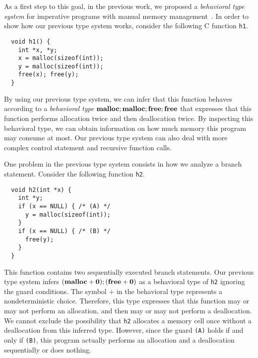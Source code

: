 
As a first step to this goal, in the previous work, we proposed a
\emph{behavioral type system} for imperative programs with manual memory
management~\cite{tanPPL2015}.  In order to show how our previous type
system works, consider the following C function \verb|h1|.
\begin{verbatim}
  void h1() {
    int *x, *y;
    x = malloc(sizeof(int));
    y = malloc(sizeof(int));
    free(x); free(y);
  }
\end{verbatim}
By using our previous type system, we can infer that this function
behaves according to a \emph{behavioral type}
$\mathbf{malloc};\mathbf{malloc};\mathbf{free};\mathbf{free}$ that expresses that this function performs
allocation twice and then deallocation twice.  By inspecting this behavioral
type, we can obtain information on how much memory this program may
consume at most.  Our previous type system can also deal with more
complex control statement and recursive function calls.

One problem in the previous type system consists in how we analyze a
branch statement.  Consider the following function \verb|h2|.
\begin{verbatim}
  void h2(int *x) {
    int *y;
    if (x == NULL) { /* (A) */
      y = malloc(sizeof(int));
    }
    if (x == NULL) { /* (B) */
      free(y);
    }
  }
\end{verbatim}
This function contains two sequentially executed branch statements.  Our
previous type system infers $(\mathbf{malloc} + \mathbf{0}); (\mathbf{free} + \mathbf{0})$ as a
behavioral type of \verb|h2| ignoring the guard conditions.  The symbol
$+$ in the behavioral type represents a nondeterministic choice.
Therefore, this type expresses that this function may or may not perform
an allocation, and then may or may not perform a deallocation.  We
cannot exclude the possibility that \verb|h2| allocates a memory cell
once without a deallocation from this inferred type.  However, since the
guard \verb|(A)| holds if and only if \verb|(B)|, this program actually
performs an allocation and a deallocation sequentially or does nothing.

